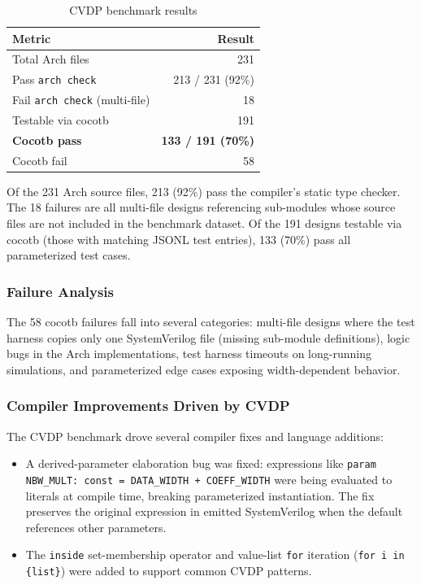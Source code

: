 \documentclass[11pt,twocolumn]{article}
\begin{document}
\begin{table}[t]
\centering
\caption{CVDP benchmark results}
\label{tab:cvdp}
\footnotesize
\begin{tabular}{@{}lr@{}}
\toprule
\textbf{Metric} & \textbf{Result} \\
\midrule
Total Arch files & 231 \\
Pass \texttt{arch check} & 213 / 231 (92\%) \\
Fail \texttt{arch check} (multi-file) & 18 \\
Testable via cocotb & 191 \\
\textbf{Cocotb pass} & \textbf{133 / 191 (70\%)} \\
Cocotb fail & 58 \\
\bottomrule
\end{tabular}
\end{table}

Of the 231 Arch source files, 213 (92\%) pass the compiler's static type checker. The 18 failures are all multi-file designs referencing sub-modules whose source files are not included in the benchmark dataset. Of the 191 designs testable via cocotb (those with matching JSONL test entries), 133 (70\%) pass all parameterized test cases.

\subsubsection{Failure Analysis}

The 58 cocotb failures fall into several categories: multi-file designs where the test harness copies only one SystemVerilog file (missing sub-module definitions), logic bugs in the Arch implementations, test harness timeouts on long-running simulations, and parameterized edge cases exposing width-dependent behavior.

\subsubsection{Compiler Improvements Driven by CVDP}

The CVDP benchmark drove several compiler fixes and language additions:

\begin{itemize}
\item A derived-parameter elaboration bug was fixed: expressions like \texttt{param NBW\_MULT: const = DATA\_WIDTH + COEFF\_WIDTH} were being evaluated to literals at compile time, breaking parameterized instantiation. The fix preserves the original expression in emitted SystemVerilog when the default references other parameters.
\item The \texttt{inside} set-membership operator and value-list \texttt{for} iteration (\texttt{for i in \{list\}}) were added to support common CVDP patterns.
\end{itemize}
\end{document}
